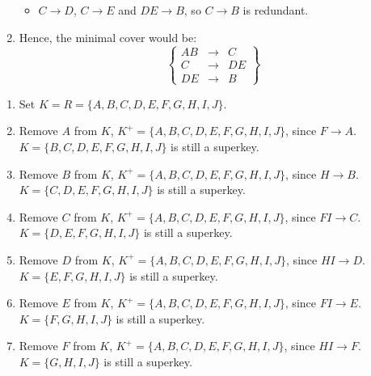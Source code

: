 \documentclass[11pt,letterpaper,titlepage,en-US]{article}
\begin{document}
\begin{homeworkProblem}
\begin{enumerate}[label=\textbf{Step {\arabic*}}, leftmargin=2cm]
\begin{itemize}
                \item $C \rightarrow D$, $C \rightarrow E$ and $DE \rightarrow B$, so $C \rightarrow B$ is redundant.
            \end{itemize}
        \item Hence, the minimal cover would be:
            \[\left\{
                    \begin{array}{rcl}
                        AB &\rightarrow& C \\
                        C &\rightarrow& DE \\
                        DE &\rightarrow& B
                    \end{array}
            \right\}\]
    \end{enumerate}
\end{homeworkProblem}
\pagebreak
\begin{homeworkProblem}
    \begin{homeworkSubProblem}
        \begin{enumerate}[label=\textbf{Step {\arabic*}}, leftmargin=2cm]
            \item Set $K = R = \{A,B,C,D,E,F,G,H,I,J\}$.
            \item Remove $A$ from $K$, $K^+ = \{A,B,C,D,E,F,G,H,I,J\}$, since $F \rightarrow A$.\\
                $K = \{B,C,D,E,F,G,H,I,J\}$ is still a superkey.
            \item Remove $B$ from $K$, $K^+ = \{A,B,C,D,E,F,G,H,I,J\}$, since $H \rightarrow B$.\\
                $K = \{C,D,E,F,G,H,I,J\}$ is still a superkey.
            \item Remove $C$ from $K$, $K^+ = \{A,B,C,D,E,F,G,H,I,J\}$, since $FI \rightarrow C$.\\
                $K = \{D,E,F,G,H,I,J\}$ is still a superkey.
            \item Remove $D$ from $K$, $K^+ = \{A,B,C,D,E,F,G,H,I,J\}$, since $HI \rightarrow D$.\\
                $K = \{E,F,G,H,I,J\}$ is still a superkey.
            \item Remove $E$ from $K$, $K^+ = \{A,B,C,D,E,F,G,H,I,J\}$, since $FI \rightarrow E$.\\
                $K = \{F,G,H,I,J\}$ is still a superkey.
            \item Remove $F$ from $K$, $K^+ = \{A,B,C,D,E,F,G,H,I,J\}$, since $HI \rightarrow F$.\\
                $K = \{G,H,I,J\}$ is still a superkey.

\end{enumerate}
\end{homeworkSubProblem}
\end{homeworkProblem}
\end{document}
